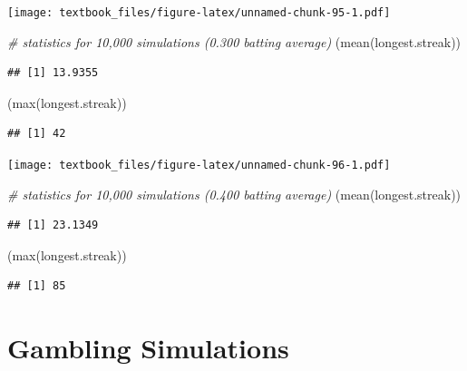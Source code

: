 \documentclass[
  11pt,
]{book}
\newenvironment{Shaded}{\begin{snugshade}}{\end{snugshade}}
\newcommand{\CommentTok}[1]{\textcolor[rgb]{0.56,0.35,0.01}{\textit{#1}}}
\newcommand{\FunctionTok}[1]{\textcolor[rgb]{0.00,0.00,0.00}{#1}}
\newcommand{\NormalTok}[1]{#1}
\theoremstyle{definition}
\theoremstyle{definition}
\theoremstyle{definition}
\theoremstyle{definition}
\theoremstyle{remark}
\begin{document}
\texttt{[image: textbook\_files/figure-latex/unnamed-chunk-95-1.pdf]}

\begin{Shaded}
\begin{Highlighting}[]
\CommentTok{\# statistics for 10,000 simulations (0.300 batting average)}
\NormalTok{(}\FunctionTok{mean}\NormalTok{(longest.streak))}
\end{Highlighting}
\end{Shaded}

\begin{verbatim}
## [1] 13.9355
\end{verbatim}

\begin{Shaded}
\begin{Highlighting}[]
\NormalTok{(}\FunctionTok{max}\NormalTok{(longest.streak))}
\end{Highlighting}
\end{Shaded}

\begin{verbatim}
## [1] 42
\end{verbatim}

\vfill
\newpage

\texttt{[image: textbook\_files/figure-latex/unnamed-chunk-96-1.pdf]}

\begin{Shaded}
\begin{Highlighting}[]
\CommentTok{\# statistics for 10,000 simulations (0.400 batting average)}
\NormalTok{(}\FunctionTok{mean}\NormalTok{(longest.streak))}
\end{Highlighting}
\end{Shaded}

\begin{verbatim}
## [1] 23.1349
\end{verbatim}

\begin{Shaded}
\begin{Highlighting}[]
\NormalTok{(}\FunctionTok{max}\NormalTok{(longest.streak))}
\end{Highlighting}
\end{Shaded}

\begin{verbatim}
## [1] 85
\end{verbatim}

\newpage

\hypertarget{gambling-simulations}{%
\section{Gambling Simulations}\label{gambling-simulations}}
\end{document}
